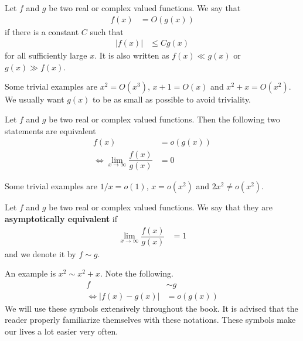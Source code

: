 \documentclass[elemannt.tex]{subfile}
\begin{document}
		\begin{definition}[Big O]
			Let $f$ and $g$ be two real or complex valued functions. We say that
				\begin{align*}
					f(x)
					& = O(g(x))
				\end{align*}
			if there is a constant $C$ such that
				\begin{align*}
					|f(x)|
					& \leq Cg(x)
				\end{align*}
			for all sufficiently large $x$. It is also written as $f(x)\ll g(x)$  or $g(x)\gg f(x)$.
		\end{definition}
	Some trivial examples are $x^{2}=O(x^{3})$, $x+1=O(x)$ and $x^{2}+x=O(x^{2})$. We usually want $g(x)$ to be as small as possible to avoid triviality.
		\begin{definition}[Small O]
			Let $f$ and $g$ be two real or complex valued functions. Then the following two statements are equivalent
				\begin{align*}
					f(x)
						& = o(g(x))\\
					\iff \lim\limits_{x\to\infty}\dfrac{f(x)}{g(x)}
						& = 0
				\end{align*}
		\end{definition}
	Some trivial examples are $1/x=o(1)$, $x=o(x^{2})$ and $2x^{2}\neq o(x^{2})$.
		\begin{definition}[Equivalence]
			Let $f$ and $g$ be two real or complex valued functions. We say that they are \textbf{asymptotically equivalent} if
				\begin{align*}
					\lim\limits_{x\to\infty}\dfrac{f(x)}{g(x)}
						& = 1
				\end{align*}
			and we denote it by $f\sim g$.
		\end{definition}
	An example is $x^{2}\sim x^{2}+x$. Note the following.
		\begin{align*}
			f
				& \sim g\\
			\iff |f(x)-g(x)|
				& = o(g(x))
		\end{align*}
	We will use these symbols extensively throughout the book. It is advised that the reader properly familiarize themselves with these notations. These symbols make our lives a lot easier very often. 
\end{document}
